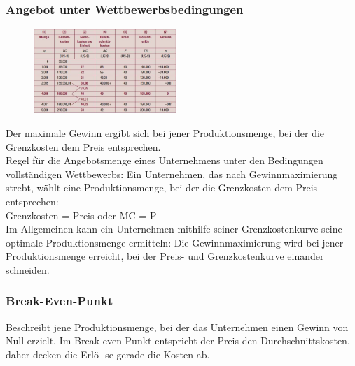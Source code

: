 \documentclass[10pt]{scrartcl}
\begin{document}
\subsubsection{Angebot unter Wettbewerbsbedingungen}
\begin{figure}
  \begin{center}
   \vspace{-20pt}
    \includegraphics[width=0.48\textwidth]{img/hans.jpg}
      \vspace{-20pt}
  \end{center}
\end{figure}
Der maximale Gewinn ergibt sich bei jener Produktionsmenge, bei der die Grenzkosten dem Preis entsprechen. \\
Regel für die Angebotsmenge eines Unternehmens unter den Bedingungen vollständigen Wettbewerbs: Ein Unternehmen, das nach Gewinnmaximierung strebt, wählt eine Produktionsmenge, bei der die Grenzkosten dem Preis entsprechen:\\
Grenzkosten = Preis oder MC = P\\
Im Allgemeinen kann ein Unternehmen mithilfe seiner Grenzkostenkurve seine optimale Produktionsmenge ermitteln: Die Gewinnmaximierung wird bei jener Produktionsmenge erreicht, bei der Preis- und Grenzkostenkurve einander schneiden.
\subsubsection{Break-Even-Punkt}
Beschreibt jene Produktionsmenge, bei der das Unternehmen einen Gewinn von Null erzielt. Im Break-even-Punkt entspricht der Preis den Durchschnittskosten, daher decken die Erlö- se gerade die Kosten ab.  
\end{document}
